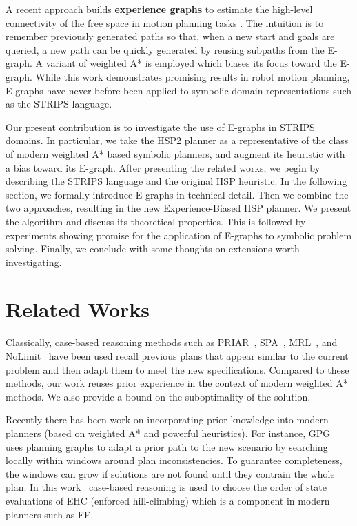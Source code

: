 \documentclass[letterpaper]{article}
\begin{document}
A recent approach builds \textbf{experience graphs} to estimate the high-level connectivity of the free space in motion planning tasks \cite{phillips2012graphs}.
The intuition is to remember previously generated paths so that, when a new start and goals are queried, a new path can be quickly generated by reusing subpaths from the E-graph.
A variant of weighted A* is employed which biases its focus toward the E-graph.
While this work demonstrates promising results in robot motion planning, E-graphs have never before been applied to symbolic domain representations such as the STRIPS language.

Our present contribution is to investigate the use of E-graphs in STRIPS domains. In particular, we take the HSP2 planner \cite{bonet2001planning} as a representative of the class of modern weighted A* based symbolic planners, and augment its heuristic with a bias toward its E-graph. After presenting the related works, we begin by describing the STRIPS language and the original HSP heuristic. In the following section, we formally introduce E-graphs in technical detail. Then we combine the two approaches, resulting in the new Experience-Biased HSP planner. We present the algorithm and discuss its theoretical properties. This is followed by experiments showing promise for the application of E-graphs to symbolic problem solving. Finally, we conclude with some thoughts on extensions worth investigating.

\section{Related Works}

Classically, case-based reasoning methods 
such as PRIAR~\cite{Kamb:92}, SPA~\cite{Hank:95}, MRL~\cite{Koeh:94}, and NoLimit~\cite{mljournal}
have been used recall 
previous plans that appear similar to the current problem and 
then adapt them to meet the new specifications.
Compared to these methods, our work reuses prior experience in
the context of modern weighted A* methods. We also provide
a bound on the suboptimality of the solution. 

Recently there has been work on incorporating prior knowledge 
into modern planners (based on weighted A* and powerful heuristics).
For instance, GPG~\cite{Gere:00} uses planning graphs to adapt a prior path to the 
new scenario by searching locally within windows around plan 
inconsistencies. To guarantee completeness, the windows can grow 
if solutions are not found until they contrain the whole plan.
In this work~\cite{DBLP:conf/iccbr/RosaOB07} case-based reasoning is used to choose the 
order of state evaluations of EHC (enforced hill-climbing) which 
is a component in modern planners such as FF. 
\end{document}
